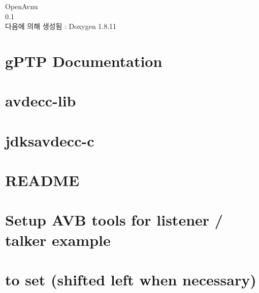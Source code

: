 \documentclass[twoside]{book}
\newcommand{\+}{\discretionary{\mbox{\scriptsize$\hookleftarrow$}}{}{}}
\newcommand{\clearemptydoublepage}{%
  \newpage{\pagestyle{empty}\cleardoublepage}%
}
\begin{document}
\hypersetup{pageanchor=false,
             bookmarksnumbered=true,
             pdfencoding=unicode
            }
\begin{titlepage}
\vspace*{7cm}
\begin{center}%
{\Large Open\+Avnu \\[1ex]\large 0.\+1 }\\
\vspace*{1cm}
{\large 다음에 의해 생성됨 \+:  Doxygen 1.8.11}\\
\end{center}
\end{titlepage}
\clearemptydoublepage
\tableofcontents
\clearemptydoublepage
{}
\hypersetup{pageanchor=true}

\chapter{g\+P\+TP Documentation}
\label{index}\hypertarget{index}{}
\chapter{avdecc-\/lib}
\label{md_avdecc-lib_controller_lib_doc_design}
\hypertarget{md_avdecc-lib_controller_lib_doc_design}{}

\chapter{jdksavdecc-\/c}
\label{md_avdecc-lib_jdksavdecc-c_README}
\hypertarget{md_avdecc-lib_jdksavdecc-c_README}{}

\chapter{R\+E\+A\+D\+ME}
\label{md_avdecc-lib_README}
\hypertarget{md_avdecc-lib_README}{}

\chapter{Setup A\+VB tools for listener / talker example}
\label{md_documents_examples_AVB_Talker_Listener_Example_Setup}
\hypertarget{md_documents_examples_AVB_Talker_Listener_Example_Setup}{}

\chapter{to set (shifted left when necessary)}
\label{page}
\hypertarget{page}{}

\end{document}
